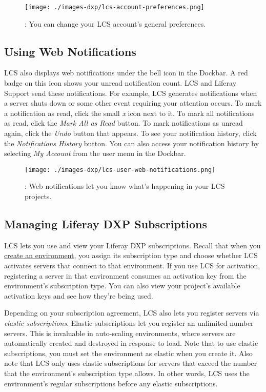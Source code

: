 \begin{figure}
\centering
\texttt{[image: ./images-dxp/lcs-account-preferences.png]}
\caption{: You can change your LCS account's general preferences.}
\end{figure}

\subsection{Using Web Notifications}\label{using-web-notifications}

LCS also displays web notifications under the bell icon in the Dockbar.
A red badge on this icon shows your unread notification count. LCS and
Liferay Support send these notifications. For example, LCS generates
notifications when a server shuts down or some other event requiring
your attention occurs. To mark a notification as read, click the small
\emph{x} icon next to it. To mark all notifications as read, click the
\emph{Mark All as Read} button. To mark notifications as unread again,
click the \emph{Undo} button that appears. To see your notification
history, click the \emph{Notifications History} button. You can also
access your notification history by selecting \emph{My Account} from the
user menu in the Dockbar.

\begin{figure}
\centering
\texttt{[image: ./images-dxp/lcs-user-web-notifications.png]}
\caption{: Web notifications let you know what's happening in your LCS
projects.}
\end{figure}

\subsection{Managing Liferay DXP
Subscriptions}\label{managing-liferay-dxp-subscriptions}

LCS lets you use and view your Liferay DXP subscriptions. Recall that
when you \hyperref[creating-an-environment]{create an environment}, you
assign its subscription type and choose whether LCS activates servers
that connect to that environment. If you use LCS for activation,
registering a server in that environment consumes an activation key from
the environment's subscription type. You can also view your project's
available activation keys and see how they're being used.

Depending on your subscription agreement, LCS also lets you register
servers via \emph{elastic subscriptions}. Elastic subscriptions let you
register an unlimited number servers. This is invaluable in auto-scaling
environments, where servers are automatically created and destroyed in
response to load. Note that to use elastic subscriptions, you must set
the environment as elastic when you create it. Also note that LCS only
uses elastic subscriptions for servers that exceed the number that the
environment's subscription type allows. In other words, LCS uses the
environment's regular subscriptions before any elastic subscriptions.

